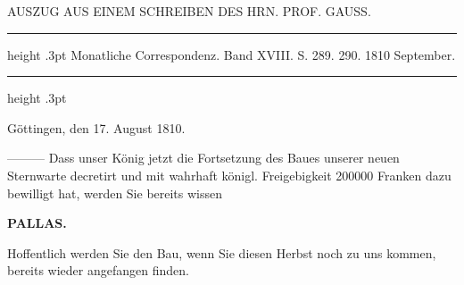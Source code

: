 \par\bigskip
{}
\hypertarget{native-323-lower}{}\label{native-323-lower}
\begin{center}\large AUSZUG AUS EINEM SCHREIBEN DES HRN. PROF. GAUSS.\end{center}
\begin{center}
\parbox{.72\linewidth}{%
\centering\fontsize{8.2}{10.2}\selectfont
\hrule height .3pt\relax\vspace{2.5pt}
Monatliche Correspondenz. Band XVIII. S. 289. 290. 1810 September.\par
\vspace{2.5pt}\hrule height .3pt\relax
}
\end{center}
\begin{flushright}Göttingen, den 17. August 1810.\end{flushright}

\par\indent ---\enspace---\enspace--- Dass unser König jetzt die Fortsetzung des Baues unserer neuen Sternwarte decretirt und mit wahrhaft königl. Freigebigkeit 200000 Franken dazu bewilligt hat, werden Sie bereits wissen
\par
\clearpage
\thispagestyle{empty}
\noindent{}%
\makebox[12mm][l]{}%
\parbox[t]{\dimexpr\linewidth-24mm\relax}{\centering\footnotesize\bfseries PALLAS.\par}%
\par\nobreak\medskip
\noindent Hoffentlich werden Sie den Bau, wenn Sie diesen Herbst noch zu uns kommen, bereits wieder angefangen finden.

